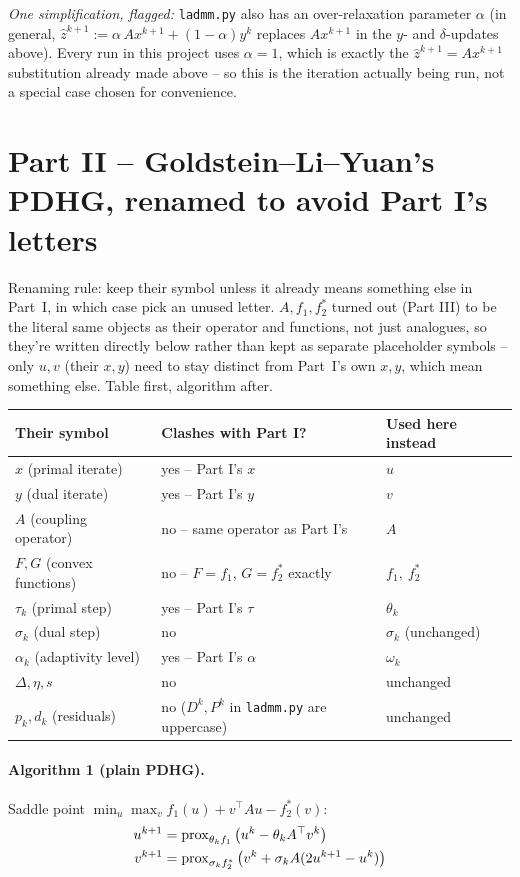 \documentclass[11pt]{article}
\newcommand{\code}[1]{\texttt{#1}}
\newcommand{\prox}{\operatorname{prox}}
\begin{document}
\emph{One simplification, flagged:} \code{ladmm.py} also has an over-relaxation
parameter $\alpha$ (in general, $\hat z^{k+1}:=\alpha\, Ax^{k+1}+(1-\alpha)y^k$ replaces
$Ax^{k+1}$ in the $y$- and $\delta$-updates above). Every run in this project uses
$\alpha=1$, which is exactly the $\hat z^{k+1}=Ax^{k+1}$ substitution already made above
-- so this is the iteration actually being run, not a special case chosen for convenience.

\section*{Part II -- Goldstein--Li--Yuan's PDHG, renamed to avoid Part I's letters}
Renaming rule: keep their symbol unless it already means something else in Part~I, in
which case pick an unused letter. $A,f_1,f_2^*$ turned out (Part III) to be the literal
same objects as their operator and functions, not just analogues, so they're written
directly below rather than kept as separate placeholder symbols -- only $u,v$ (their
$x,y$) need to stay distinct from Part~I's own $x,y$, which mean something else. Table
first, algorithm after.
\begin{center}
\begin{tabular}{@{}lll@{}}
\toprule
Their symbol & Clashes with Part I? & Used here instead\\
\midrule
$x$ (primal iterate) & yes -- Part I's $x$ & $u$\\
$y$ (dual iterate) & yes -- Part I's $y$ & $v$\\
$A$ (coupling operator) & no -- same operator as Part I's & $A$\\
$F,G$ (convex functions) & no -- $F=f_1$, $G=f_2^*$ exactly & $f_1,\ f_2^*$\\
$\tau_k$ (primal step) & yes -- Part I's $\tau$ & $\theta_k$\\
$\sigma_k$ (dual step) & no & $\sigma_k$ (unchanged)\\
$\alpha_k$ (adaptivity level) & yes -- Part I's $\alpha$ & $\omega_k$\\
$\Delta,\eta,s$ & no & unchanged\\
$p_k,d_k$ (residuals) & no ($D^k,P^k$ in \code{ladmm.py} are uppercase) & unchanged\\
\bottomrule
\end{tabular}
\end{center}

\paragraph{Algorithm 1 (plain PDHG).} Saddle point $\min_u\max_v f_1(u)+v^\top Au-f_2^*(v)$:
\begin{align}
u^{k+1} &= \prox_{\theta_k f_1}\big(u^k - \theta_k A^\top v^k\big) \notag\\
v^{k+1} &= \prox_{\sigma_k f_2^*}\big(v^k + \sigma_k A(2u^{k+1}-u^k)\big) \notag
\end{align}
\end{document}
